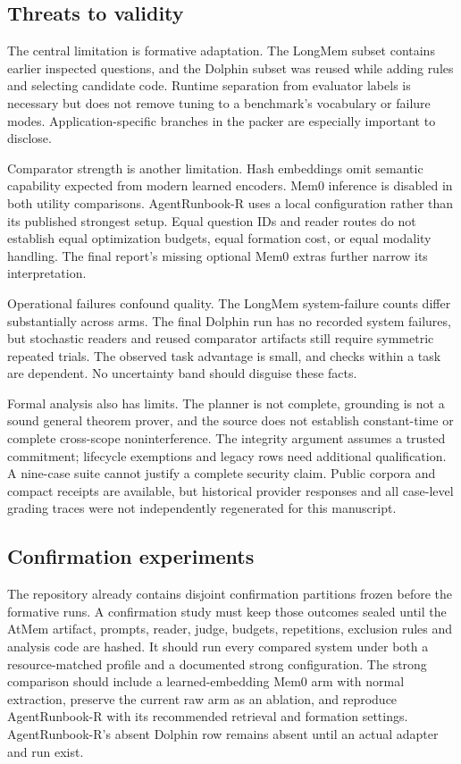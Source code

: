 \documentclass[10pt,twocolumn]{article}
\begin{document}
\subsection{Threats to validity}
The central limitation is formative adaptation. The LongMem subset contains earlier inspected questions, and the Dolphin subset was reused while adding rules and selecting candidate code. Runtime separation from evaluator labels is necessary but does not remove tuning to a benchmark's vocabulary or failure modes. Application-specific branches in the packer are especially important to disclose.

Comparator strength is another limitation. Hash embeddings omit semantic capability expected from modern learned encoders. Mem0 inference is disabled in both utility comparisons. AgentRunbook-R uses a local configuration rather than its published strongest setup. Equal question IDs and reader routes do not establish equal optimization budgets, equal formation cost, or equal modality handling. The final report's missing optional Mem0 extras further narrow its interpretation.

Operational failures confound quality. The LongMem system-failure counts differ substantially across arms. The final Dolphin run has no recorded system failures, but stochastic readers and reused comparator artifacts still require symmetric repeated trials. The observed task advantage is small, and checks within a task are dependent. No uncertainty band should disguise these facts.

Formal analysis also has limits. The planner is not complete, grounding is not a sound general theorem prover, and the source does not establish constant-time or complete cross-scope noninterference. The integrity argument assumes a trusted commitment; lifecycle exemptions and legacy rows need additional qualification. A nine-case suite cannot justify a complete security claim. Public corpora and compact receipts are available, but historical provider responses and all case-level grading traces were not independently regenerated for this manuscript.

\subsection{Confirmation experiments}
The repository already contains disjoint confirmation partitions frozen before the formative runs. A confirmation study must keep those outcomes sealed until the AtMem artifact, prompts, reader, judge, budgets, repetitions, exclusion rules and analysis code are hashed. It should run every compared system under both a resource-matched profile and a documented strong configuration. The strong comparison should include a learned-embedding Mem0 arm with normal extraction, preserve the current raw arm as an ablation, and reproduce AgentRunbook-R with its recommended retrieval and formation settings. AgentRunbook-R's absent Dolphin row remains absent until an actual adapter and run exist.
\end{document}
